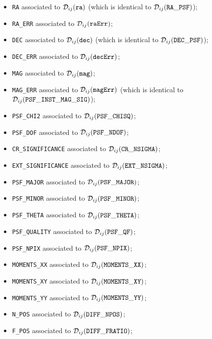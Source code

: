 \documentclass[panstarrs,spec]{panstarrs}
\begin{document}
\begin{itemize}
\item \texttt{RA} associated to ${\cal D}_{ij}(\mathtt{ra})$ (which is
  identical to ${\cal D}_{ij}(\mathtt{RA\_PSF})$);
\item \texttt{RA\_ERR} associated to ${\cal D}_{ij}(\mathtt{raErr})$;
\item \texttt{DEC} associated to ${\cal D}_{ij}(\mathtt{dec})$ (which
  is identical to ${\cal D}_{ij}(\mathtt{DEC\_PSF})$);
\item \texttt{DEC\_ERR} associated to ${\cal
    D}_{ij}(\mathtt{decErr})$;
\item \texttt{MAG} associated to ${\cal D}_{ij}(\mathtt{mag})$;
\item \texttt{MAG\_ERR} associated to ${\cal D}_{ij}(\mathtt{magErr})$
  (which is identical to ${\cal
    D}_{ij}(\mathtt{PSF\_INST\_MAG\_SIG})$);
\item \texttt{PSF\_CHI2} associated to ${\cal
    D}_{ij}(\mathtt{PSF\_CHISQ})$;
\item \texttt{PSF\_DOF} associated to ${\cal
    D}_{ij}(\mathtt{PSF\_NDOF})$;
\item \texttt{CR\_SIGNIFICANCE} associated to ${\cal
    D}_{ij}(\mathtt{CR\_NSIGMA})$;
\item \texttt{EXT\_SIGNIFICANCE} associated to ${\cal
    D}_{ij}(\mathtt{EXT\_NSIGMA})$;
\item \texttt{PSF\_MAJOR} associated to ${\cal
    D}_{ij}(\mathtt{PSF\_MAJOR})$;
\item \texttt{PSF\_MINOR} associated to ${\cal
    D}_{ij}(\mathtt{PSF\_MINOR})$;
\item \texttt{PSF\_THETA} associated to ${\cal
    D}_{ij}(\mathtt{PSF\_THETA})$;
\item \texttt{PSF\_QUALITY} associated to ${\cal
    D}_{ij}(\mathtt{PSF\_QF})$;
\item \texttt{PSF\_NPIX} associated to ${\cal
    D}_{ij}(\mathtt{PSF\_NPIX})$;
\item \texttt{MOMENTS\_XX} associated to ${\cal
    D}_{ij}(\mathtt{MOMENTS\_XX})$;
\item \texttt{MOMENTS\_XY} associated to ${\cal
    D}_{ij}(\mathtt{MOMENTS\_XY})$;
\item \texttt{MOMENTS\_YY} associated to ${\cal
    D}_{ij}(\mathtt{MOMENTS\_YY})$;
\item \texttt{N\_POS} associated to ${\cal
    D}_{ij}(\mathtt{DIFF\_NPOS})$;
\item \texttt{F\_POS} associated to ${\cal
    D}_{ij}(\mathtt{DIFF\_FRATIO})$;

\end{itemize}
\end{document}
